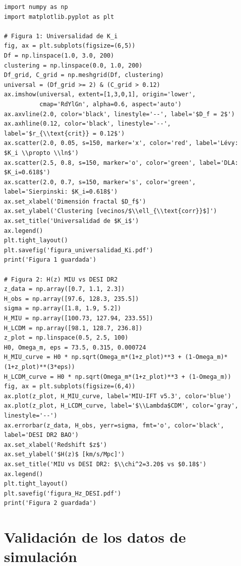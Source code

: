 \documentclass[12pt, a4paper]{article}
\theoremstyle{miuThm}
\theoremstyle{remark}
\begin{document}
\begin{verbatim}
import numpy as np
import matplotlib.pyplot as plt

# Figura 1: Universalidad de K_i
fig, ax = plt.subplots(figsize=(6,5))
Df = np.linspace(1.0, 3.0, 200)
clustering = np.linspace(0.0, 1.0, 200)
Df_grid, C_grid = np.meshgrid(Df, clustering)
universal = (Df_grid >= 2) & (C_grid > 0.12)
ax.imshow(universal, extent=[1,3,0,1], origin='lower',
          cmap='RdYlGn', alpha=0.6, aspect='auto')
ax.axvline(2.0, color='black', linestyle='--', label='$D_f = 2$')
ax.axhline(0.12, color='black', linestyle='--', label='$r_{\\text{crit}} = 0.12$')
ax.scatter(2.0, 0.05, s=150, marker='x', color='red', label='Lévy: $K_i \\propto \\ln$')
ax.scatter(2.5, 0.8, s=150, marker='o', color='green', label='DLA: $K_i=0.618$')
ax.scatter(2.0, 0.7, s=150, marker='s', color='green', label='Sierpinski: $K_i=0.618$')
ax.set_xlabel('Dimensión fractal $D_f$')
ax.set_ylabel('Clustering [vecinos/$\\ell_{\\text{corr}}$]')
ax.set_title('Universalidad de $K_i$')
ax.legend()
plt.tight_layout()
plt.savefig('figura_universalidad_Ki.pdf')
print('Figura 1 guardada')

# Figura 2: H(z) MIU vs DESI DR2
z_data = np.array([0.7, 1.1, 2.3])
H_obs = np.array([97.6, 128.3, 235.5])
sigma = np.array([1.8, 1.9, 5.2])
H_MIU = np.array([100.73, 127.94, 233.55])
H_LCDM = np.array([98.1, 128.7, 236.8])
z_plot = np.linspace(0.5, 2.5, 100)
H0, Omega_m, eps = 73.5, 0.315, 0.000724
H_MIU_curve = H0 * np.sqrt(Omega_m*(1+z_plot)**3 + (1-Omega_m)*(1+z_plot)**(3*eps))
H_LCDM_curve = H0 * np.sqrt(Omega_m*(1+z_plot)**3 + (1-Omega_m))
fig, ax = plt.subplots(figsize=(6,4))
ax.plot(z_plot, H_MIU_curve, label='MIU-IFT v5.3', color='blue')
ax.plot(z_plot, H_LCDM_curve, label='$\\Lambda$CDM', color='gray', linestyle='--')
ax.errorbar(z_data, H_obs, yerr=sigma, fmt='o', color='black', label='DESI DR2 BAO')
ax.set_xlabel('Redshift $z$')
ax.set_ylabel('$H(z)$ [km/s/Mpc]')
ax.set_title('MIU vs DESI DR2: $\\chi^2=3.20$ vs $0.18$')
ax.legend()
plt.tight_layout()
plt.savefig('figura_Hz_DESI.pdf')
print('Figura 2 guardada')
\end{verbatim}

\clearpage
\section{Validación de los datos de simulación}
\end{document}

